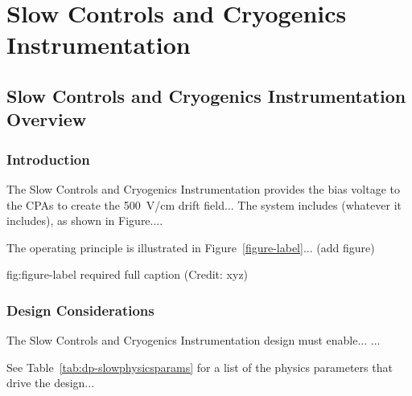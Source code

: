 \chapter{Slow Controls and Cryogenics Instrumentation}
\label{ch:fddp-slow-cryo}

\section{Slow Controls and Cryogenics Instrumentation Overview}
\label{sec:fddp-slow-cryo-ov}


\subsection{Introduction}
\label{sec:fddp-slow-cryo-intro}

The Slow Controls and Cryogenics Instrumentation provides the bias voltage to the CPAs to create the \SI{500}{V/cm} drift field...
The system includes (whatever it includes), as shown in Figure.... 


The operating principle is illustrated in Figure~\ref{figure-label}... (add figure)

\begin{dunefigure}{fig:figure-label}
{required full caption (Credit: xyz)}
\end{dunefigure}

\subsection{Design Considerations}
\label{sec:fddp-slow-cryo-des-consid}


The Slow Controls and Cryogenics Instrumentation design must enable... 
...


See Table~\ref{tab:dp-slowphysicsparams} for a list of the physics parameters that drive the design...

